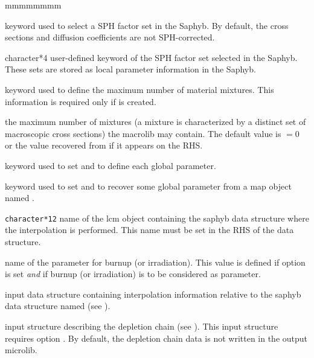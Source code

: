 \begin{ListeDeDescription}{mmmmmmmm}
\item[\moc{EQUI}] keyword used to select a SPH factor set in the Saphyb. By default, the cross sections and diffusion coefficients
are not SPH-corrected.

\item[\dusa{TEXT4}] character*4 user-defined keyword of the SPH factor set selected in the Saphyb. These sets are stored as local parameter information in the Saphyb.

\item[\moc{NMIX}] keyword used to define the maximum number of material mixtures. This information is required only if  is created.

\item[\dusa{nmixt}] the maximum number of mixtures (a mixture is characterized by a distinct set of 
macroscopic cross sections) the {\sc macrolib} may contain. The default value is  $=0$ or the value recovered from  if it appears on the RHS.

\item[\moc{SAPHYB}] keyword used to set  and to define each global parameter.

\item[\moc{TABLE}] keyword used to set  and to recover some global parameter from a {\sc map} object named .

\item[\dusa{SAPNAM}] {\tt character*12} name of the {\sc lcm} object containing the
{\sc saphyb} data structure where the interpolation is performed. This name must be set in the RHS of the   data structure.

\item[\dusa{namburn}] name of the parameter for burnup (or irradiation).
This value is defined if option  is set {\sl and} if burnup (or irradiation) is to be considered as parameter.

\item[\dusa{descints}] input data structure containing interpolation information relative to the {\sc saphyb} data structure named  (see ).

\item[\dstr{descdepl}] input structure describing the depletion chain (see ). This input structure requires option . By
default, the depletion chain data is not written in the output {\sc microlib}.

\end{ListeDeDescription}

